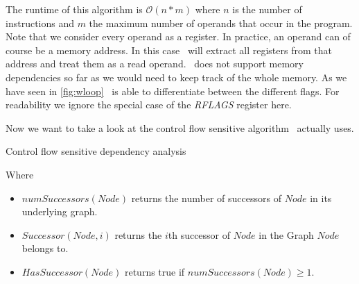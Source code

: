 The runtime of this algorithm is $\mathcal{O}(n*m)$ where $n$ is the number of instructions and $m$ the maximum number of operands that occur in the program.\\

Note that we consider every operand as a register. In practice, an operand can of course be a memory address. In this case \suaca\ will extract all registers from that address and treat them as a read operand. \suaca\ does not support memory dependencies so far as we would need to keep track of the whole memory. As we have seen in \autoref{fig:wloop} \suaca\ is able to differentiate between the different flags. For readability we ignore the special case of the \emph{RFLAGS} register here.

Now we want to take a look at the control flow sensitive algorithm \suaca\ actually uses. 
\newpage

\begin{algorithm}[H]
    \SetAlgoLined
    \caption{Control flow sensitive dependency analysis}
    \label{alg:dep}
\end{algorithm}
\vspace{5pt}

Where
\begin{itemize}
    \item $numSuccessors(Node)$ returns the number of successors of $Node$ in its underlying graph.
    \item $Successor(Node, i)$ returns the $i$th successor of $Node$ in the Graph $Node$ belongs to.
    \item $HasSuccessor(Node)$ returns true if $numSuccessors(Node) \geq 1$.
\end{itemize}

